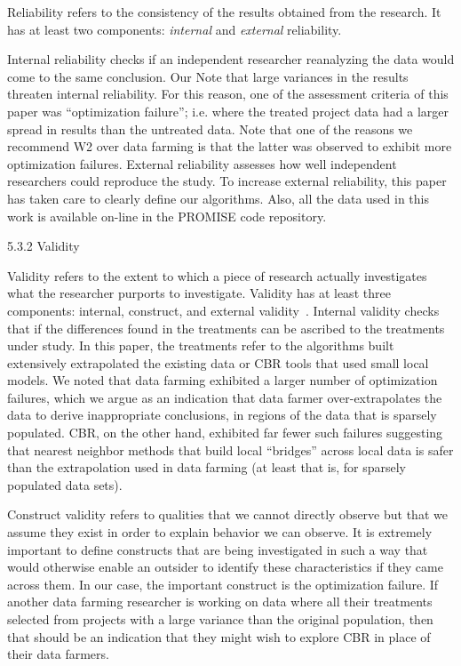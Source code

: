 \documentclass[smallcondesed]{svjour3}
\begin{document}
Reliability refers to the consistency of the results obtained
from the research. It has at least two components: {\em internal}
and {\em external} reliability.

Internal reliability checks if an independent researcher
reanalyzing the data would come to the same conclusion.
Our 
Note
that large variances in the results threaten internal reliability.
For this reason, one of the assessment criteria of this paper
was “optimization failure”; i.e. where the treated project data
had a larger spread in results than the untreated data. Note
that one of the reasons we recommend W2 over data farming
is that the latter was observed to exhibit more optimization
failures.
External reliability assesses how well independent researchers
could reproduce the study. To increase external
reliability, this paper has taken care to clearly define our
algorithms. Also, all the data used in this work is available
on-line in the PROMISE code repository.

5.3.2 Validity

Validity refers to the extent to which a piece of research actually
investigates what the researcher purports to investigate.
Validity has at least three components: internal, construct, and
external validity~\cite{Runeson200874}.
Internal validity checks that if the differences found in
the treatments can be ascribed to the treatments under study.
In this paper, the treatments refer to the algorithms built
extensively extrapolated the existing data or CBR tools that
used small local models. We noted that data farming exhibited
a larger number of optimization failures, which we argue as
an indication that data farmer over-extrapolates the data to
derive inappropriate conclusions, in regions of the data that
is sparsely populated. CBR, on the other hand, exhibited far
fewer such failures suggesting that nearest neighbor methods
that build local “bridges” across local data is safer than the
extrapolation used in data farming (at least that is, for sparsely
populated data sets).

Construct validity refers to qualities that we cannot directly
observe but that we assume they exist in order to explain
behavior we can observe. It is extremely important to define
constructs that are being investigated in such a way that would
otherwise enable an outsider to identify these characteristics
if they came across them. In our case, the important construct
is the optimization failure. If another data farming researcher
is working on data where all their treatments selected from
projects with a large variance than the original population, then
that should be an indication that they might wish to explore
CBR in place of their data farmers.
\end{document}
